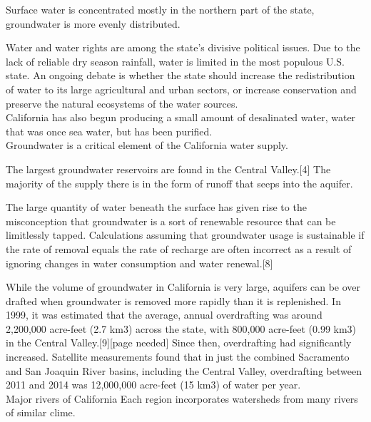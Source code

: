 \documentclass{article}
\begin{document}
Surface water is concentrated mostly in the northern part of the state, groundwater is more evenly distributed.

Water and water rights are among the state's divisive political issues. Due to the lack of reliable dry season rainfall, water is limited in the most populous U.S. state. An ongoing debate is whether the state should increase the redistribution of water to its large agricultural and urban sectors, or increase conservation and preserve the natural ecosystems of the water sources.\\




California has also begun producing a small amount of desalinated water, water that was once sea water, but has been purified.\\

Groundwater is a critical element of the California water supply. 

The largest groundwater reservoirs are found in the Central Valley.[4] The majority of the supply there is in the form of runoff that seeps into the aquifer. 



The large quantity of water beneath the surface has given rise to the misconception that groundwater is a sort of renewable resource that can be limitlessly tapped. Calculations assuming that groundwater usage is sustainable if the rate of removal equals the rate of recharge are often incorrect as a result of ignoring changes in water consumption and water renewal.[8]

While the volume of groundwater in California is very large, aquifers can be over drafted when groundwater is removed more rapidly than it is replenished. In 1999, it was estimated that the average, annual overdrafting was around 2,200,000 acre-feet (2.7 km3) across the state, with 800,000 acre-feet (0.99 km3) in the Central Valley.[9][page needed] Since then, overdrafting had significantly increased. Satellite measurements found that in just the combined Sacramento and San Joaquin River basins, including the Central Valley, overdrafting between 2011 and 2014 was 12,000,000 acre-feet (15 km3) of water per year.\\

Major rivers of California
 Each region incorporates watersheds from many rivers of similar clime. \\
\end{document}
